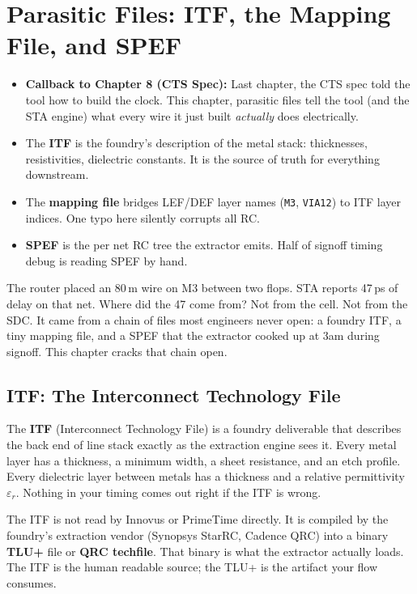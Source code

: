 \chapter{Parasitic Files: ITF, the Mapping File, and SPEF}

\begin{tldr}
\begin{itemize}
  \item \textbf{Callback to Chapter 8 (CTS Spec):} Last chapter, the CTS spec told the tool how to build the clock. This chapter, parasitic files tell the tool (and the STA engine) what every wire it just built \emph{actually} does electrically.
  \item The \textbf{ITF} is the foundry's description of the metal stack: thicknesses, resistivities, dielectric constants. It is the source of truth for everything downstream.
  \item The \textbf{mapping file} bridges LEF/DEF layer names (\texttt{M3}, \texttt{VIA12}) to ITF layer indices. One typo here silently corrupts all RC.
  \item \textbf{SPEF} is the per net RC tree the extractor emits. Half of signoff timing debug is reading SPEF by hand.
\end{itemize}
\end{tldr}

\begin{hook}
The router placed an 80\,\textmu m wire on M3 between two flops. STA reports 47\,ps of delay on that net. Where did the 47 come from? Not from the cell. Not from the SDC. It came from a chain of files most engineers never open: a foundry ITF, a tiny mapping file, and a SPEF that the extractor cooked up at 3am during signoff. This chapter cracks that chain open.
\end{hook}

\section{ITF: The Interconnect Technology File}

The \textbf{ITF} (Interconnect Technology File) is a foundry deliverable that describes the back end of line stack exactly as the extraction engine sees it. Every metal layer has a thickness, a minimum width, a sheet resistance, and an etch profile. Every dielectric layer between metals has a thickness and a relative permittivity $\varepsilon_r$. Nothing in your timing comes out right if the ITF is wrong.

\begin{keyidea}
The ITF is not read by Innovus or PrimeTime directly. It is compiled by the foundry's extraction vendor (Synopsys StarRC, Cadence QRC) into a binary \textbf{TLU+} file or \textbf{QRC techfile}. That binary is what the extractor actually loads. The ITF is the human readable source; the TLU+ is the artifact your flow consumes.
\end{keyidea}

